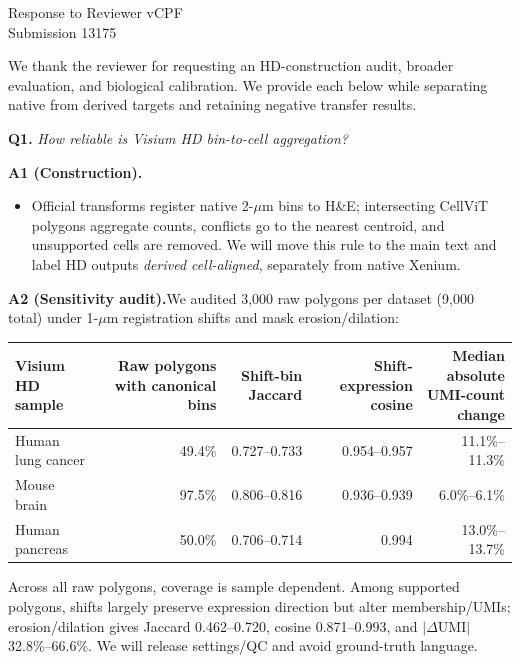 \documentclass[10pt]{article}
\newcommand{\questionsep}{\par\vspace{0.75em}}
\begin{document}
\begin{center}
{\Large Response to Reviewer vCPF}\\[2pt]
Submission 13175
\end{center}

We thank the reviewer for requesting an HD-construction audit, broader
evaluation, and biological calibration. We provide each below while separating
native from derived targets and retaining negative transfer results.

\questionsep
\textbf{Q1.}\quad
\textit{How reliable is Visium HD bin-to-cell aggregation?}

\textbf{A1 (Construction).}
\begin{itemize}
\item Official transforms register native 2-\(\mu\)m bins to H\&E; intersecting
CellViT polygons aggregate counts, conflicts go to the nearest centroid, and
unsupported cells are removed. We will move this rule to the main text and
label HD outputs \emph{derived cell-aligned}, separately from native Xenium.
\end{itemize}

\textbf{A2 (Sensitivity audit).}\enspace We audited 3,000 raw polygons per
dataset (9,000 total) under 1-\(\mu\)m
registration shifts and mask erosion/dilation:

\begin{center}
\begingroup
\scriptsize
\setlength{\tabcolsep}{2pt}
\begin{tabularx}{\linewidth}{@{}Xrrrr@{}}
\toprule
Visium HD sample & Raw polygons with canonical bins & Shift-bin Jaccard &
Shift-expression cosine & \shortstack{Median absolute\\UMI-count change} \\
\midrule
Human lung cancer & 49.4\% & 0.727--0.733 & 0.954--0.957 & 11.1\%--11.3\% \\
Mouse brain & 97.5\% & 0.806--0.816 & 0.936--0.939 & 6.0\%--6.1\% \\
Human pancreas & 50.0\% & 0.706--0.714 & 0.994 & 13.0\%--13.7\% \\
\bottomrule
\end{tabularx}
\endgroup
\end{center}

Across all raw polygons, coverage is sample dependent. Among supported
polygons, shifts largely preserve expression direction but alter
membership/UMIs; erosion/dilation gives Jaccard 0.462--0.720, cosine
0.871--0.993, and \(|\Delta\mathrm{UMI}|\) 32.8\%--66.6\%. We will release
settings/QC and avoid ground-truth language.
\end{document}

